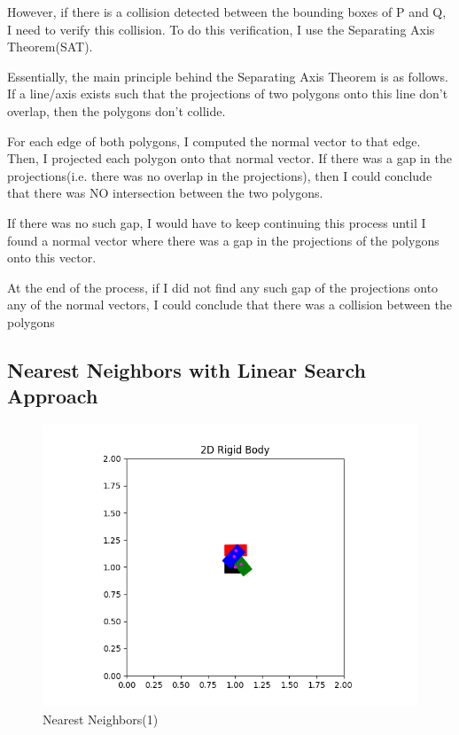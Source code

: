 \documentclass{article}
\begin{document}
However, if there is a collision detected between the bounding boxes of P and Q, I need to verify this collision. To do this verification, I use the Separating Axis Theorem(SAT). \newline 

Essentially, the main principle behind the Separating Axis Theorem is as follows. If a line/axis exists such that the projections of two polygons onto this line don't overlap, then the polygons don't collide. \newline 

For each edge of both polygons, I computed the normal vector to that edge. Then, I projected each polygon onto that normal vector. If there was a gap in the projections(i.e. there was no overlap in the projections), then I could conclude that there was NO intersection between the two polygons. 

If there was no such gap, I would have to keep continuing this process until I found a normal vector where there was a gap in the projections of the polygons onto this vector. 

At the end of the process, if I did not find any such gap of the projections onto any of the normal vectors, I could conclude that there was a collision between the polygons 

\newpage 
\subsection{Nearest Neighbors with Linear Search Approach}
\begin{figure}[h!]
	\includegraphics[width= 0.9 \linewidth]{P2_NearestNeighbor(1).png}
	\centering
	\caption{Nearest Neighbors(1)}
	\label{P2_NearestNeighbor(1).png}
\end{figure}
\end{document}

